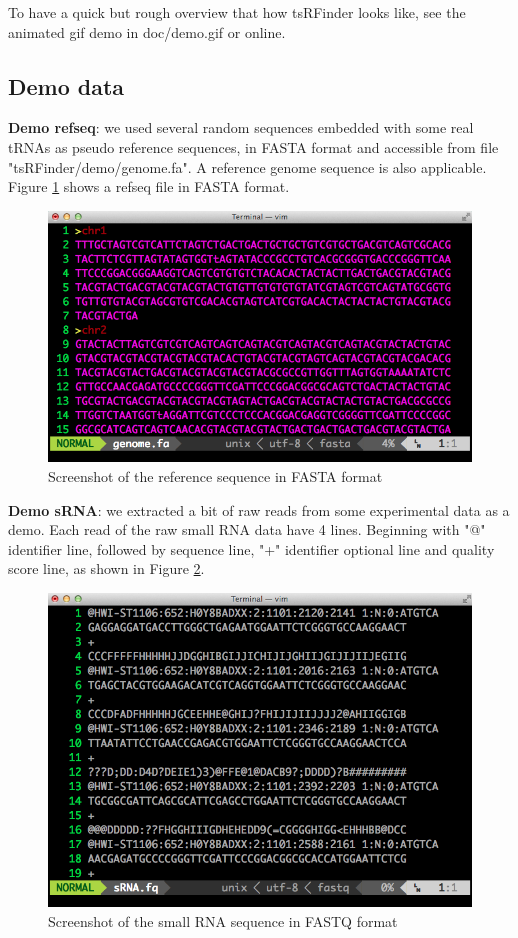 \documentclass[11pt, a4paper]{article}
\begin{document}
To have a quick but rough overview that how tsRFinder looks like, see the animated gif demo in doc/demo.gif or online.

\subsection{Demo data}

\textbf{Demo refseq}: we used several random sequences embedded with some real tRNAs as pseudo reference sequences, in FASTA format and accessible from file "tsRFinder/demo/genome.fa". A reference genome sequence is also applicable. Figure \ref{refseq} shows a refseq file in FASTA format.

\begin{figure}[htbp]
\begin{center}
\includegraphics[width=12cm]{refseq.png}
\caption{Screenshot of the reference sequence in FASTA format} 
\label{refseq}
\end{center}
\end{figure}

\textbf{Demo sRNA}: we extracted a bit of raw reads from some experimental data as a demo. Each read of the raw small RNA data have 4 lines. Beginning with "@" identifier line, followed by sequence line, "+" identifier optional line and quality score line, as shown in Figure \ref{fastq}.

\begin{figure}[htbp]
\begin{center}
\includegraphics[width=12cm]{fastq.png}
\caption{Screenshot of the small RNA sequence in FASTQ format} 
\label{fastq}
\end{center}
\end{figure}
\end{document}
